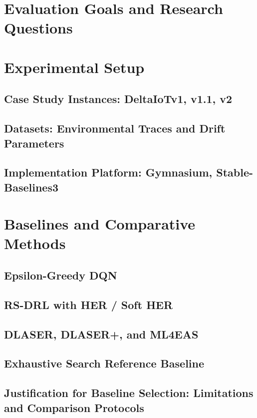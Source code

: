 \documentclass[11pt,a4paper]{article}
\begin{document}
\setcounter{section}{0}
\renewcommand{\thesection}{5.\arabic{section}}
\renewcommand{\thesubsection}{5.\arabic{section}.\arabic{subsection}}

\section{Evaluation Goals and Research Questions}

\section{Experimental Setup}
\subsection{Case Study Instances: DeltaIoTv1, v1.1, v2}
\subsection{Datasets: Environmental Traces and Drift Parameters}
\subsection{Implementation Platform: Gymnasium, Stable-Baselines3}

\section{Baselines and Comparative Methods}
\subsection{Epsilon-Greedy DQN}
\subsection{RS-DRL with HER / Soft HER}
\subsection{DLASER, DLASER+, and ML4EAS}
\subsection{Exhaustive Search Reference Baseline}
\subsection{Justification for Baseline Selection: Limitations and Comparison Protocols}
\end{document}
